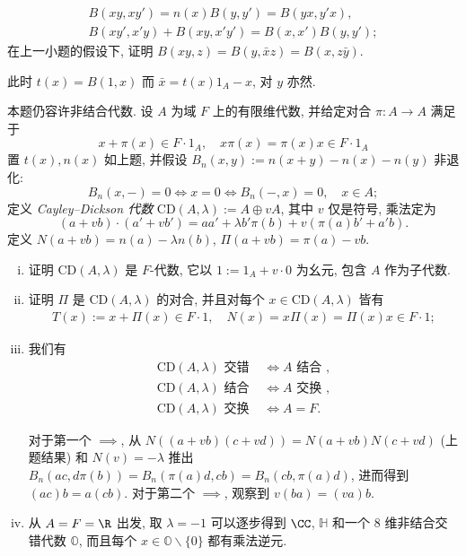 \begin{Exercises}
\begin{enumerate}[(i)]
				\begin{align*}
					B(xy,xy') = n(x)B(y,y') = B(yx,y'x), \\
					B(xy', x'y) + B(xy, x'y') = B(x,x')B(y,y');
				\end{align*}
				在上一小题的假设下, 证明 $B(xy,z) = B(y,\bar{x}z) = B(x, z\bar{y})$. \begin{hint} 此时 $t(x) = B(1,x)$ 而 $\bar{x} = t(x) 1_A - x$, 对 $y$ 亦然.\end{hint}
		\end{enumerate}
	\item 本题仍容许非结合代数. 设 $A$ 为域 $F$ 上的有限维代数, 并给定对合 $\pi: A \to A$ 满足于
		\[ x + \pi(x) \in F \cdot 1_A, \quad x\pi(x) = \pi(x) x \in F \cdot 1_A \]
		置 $t(x), n(x)$ 如上题, 并假设 $B_n(x,y) := n(x+y) - n(x) - n(y)$ 非退化:
		\[ B_n(x,-) = 0 \iff x = 0 \iff B_n(-,x)=0, \quad x \in A; \]
		定义 \emph{Cayley--Dickson 代数} $\text{CD}(A, \lambda) := A \oplus vA$, 其中 $v$ 仅是符号, 乘法定为
		\[ (a + vb) \cdot (a' + vb') = aa' + \lambda b' \pi(b) + v \left( \pi(a)b' + a'b \right). \]
		定义 $N(a+vb) = n(a) - \lambda n(b)$, $\Pi(a+vb) = \pi(a) - vb$.
		\begin{enumerate}[(i)]
			\item 证明 $\text{CD}(A, \lambda)$ 是 $F$-代数, 它以 $1 := 1_A + v \cdot 0$ 为幺元, 包含 $A$ 作为子代数.
			\item 证明 $\Pi$ 是 $\text{CD}(A, \lambda)$ 的对合, 并且对每个 $x \in \text{CD}(A, \lambda)$ 皆有
				\begin{gather*}
					T(x) := x + \Pi(x) \in F \cdot 1, \quad N(x) = x\Pi(x) = \Pi(x) x \in F \cdot 1;
				\end{gather*}
			\item 我们有
				\begin{align*}
					\text{CD}(A, \lambda) \text{ 交错} & \iff A \text { 结合 }, \\
					\text{CD}(A, \lambda) \text{ 结合 } & \iff A \text { 交换 }, \\
					\text{CD}(A, \lambda) \text{ 交换 } & \iff A=F.
				\end{align*}
				\begin{hint} 对于第一个 $\implies$, 从 $N((a+vb)(c+vd)) = N(a+vb)N(c+vd)$ (上题结果) 和 $N(v)=-\lambda$ 推出 $B_n(ac, d\pi(b)) = B_n(\pi(a)d, cb) = B_n(cb, \pi(a)d)$, 进而得到 $(ac)b = a(cb)$. 对于第二个 $\implies$, 观察到 $v(ba) = (va)b$. \end{hint}
			\item 从 $A=F=\R$ 出发, 取 $\lambda=-1$ 可以逐步得到 $\CC$, $\mathbb{H}$ 和一个 $8$ 维非结合交错代数 $\mathbb{O}$, 而且每个 $x \in \mathbb{O} \smallsetminus \{0\}$ 都有乘法逆元.

\end{enumerate}
\end{Exercises}
